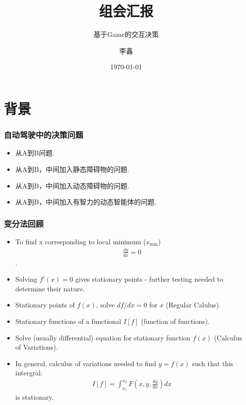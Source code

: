 \documentclass[UTF8, aspectratio=169, 10pt]{ctexbeamer}
\title{组会汇报}
\subtitle{基于Game的交互决策}
\author{李鑫}
\institute{吉林大学}
\date{\today}
\begin{document}
\frame{\titlepage}
\frame{\tableofcontents}


\section{背景}
\begin{frame}
  \frametitle{自动驾驶中的决策问题}
  \begin{itemize}
  \item 从A到B问题.
  \item 从A到B，中间加入静态障碍物的问题.
  \item 从A到B，中间加入动态障碍物的问题.
  \item 从A到B，中间加入有智力的动态智能体的问题.
  \end{itemize}
\end{frame}

\begin{frame}
  \frametitle{变分法回顾}
  \begin{itemize}
  \item To find x corresponding to local minimum ($x_{\min}$)
    \begin{align}
      \frac{dy}{dx} = 0
    \end{align}.
  \item Solving $f'(x)=0$ gives stationary points - further testing needed to
    determine their nature.
  \item Stationary points of $f(x)$, solve $df / dx=0$ for $x$ (Regular
    Calulus).
  \item Stationary functions of a functional $I[f]$ (function of functions). 
  \item Solve (usually differential) equation for stationary function $f(x)$
    (Calculus of Variations).
  \item In general, calculus of variations needed to find $y=f(x)$ such that
    this intergral:
    \begin{align}
      I[f] = \int_{x_1}^{x_2} F( x, y, \frac{dy}{dx} ) dx 
    \end{align}
    is stationary.
  \end{itemize}
\end{frame}
\end{document}
